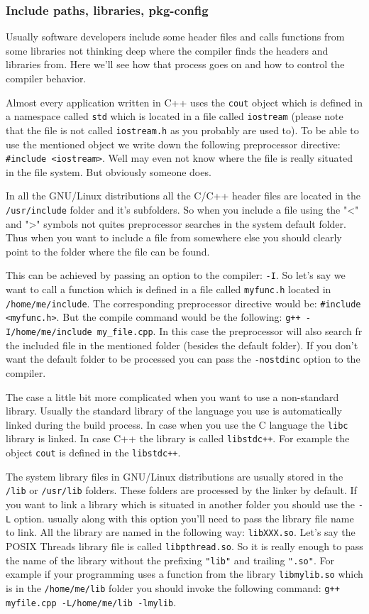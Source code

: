 \subsubsection{Include paths, libraries, pkg-config}
\label {inc_lib_pkgconfig}
Usually software developers include some header files and calls functions from some libraries not thinking deep where the compiler finds the headers and libraries from. Here we'll see how that process goes on and how to control the compiler behavior.

Almost every application written in C++ uses the {\tt cout} object which is defined in a namespace called {\tt std} which is located in a file called {\tt iostream} (please note that the file is not called {\tt iostream.h} as you probably are used to). To be able to use the mentioned object we write down the following preprocessor directive: {\tt \#include <iostream>}. Well may even not know where the file is really situated in the file system. But obviously someone does. 

In all the GNU/Linux distributions all the C/C++ header files are located in the {\tt /usr/include} folder and it's subfolders. So when you include a file using the "<" and ">" symbols not quites preprocessor searches in the system default folder. Thus when you want to include a file from somewhere else you should clearly point to the folder where the file can be found.

This can be achieved by passing an option to the compiler: {\tt -I}. So let's say we want to call a function which is defined in a file called {\tt myfunc.h} located in {\tt /home/me/include}. The corresponding preprocessor directive would be: {\tt \#include <myfunc.h>}. But the compile command would be the following: {\tt g++ -I/home/me/include my\_file.cpp}. In this case the preprocessor will also search fr the included file in the mentioned folder (besides the default folder). If you don't want the default folder to be processed you can pass the {\tt -nostdinc} option to the compiler.

The case a little bit more complicated when you want to use a non-standard library. Usually the standard library of the language you use is automatically linked during the build process. In case when you use the C language the {\tt libc} library is linked. In case C++ the library is called {\tt libstdc++}. For example the object {\tt cout} is defined in the {\tt libstdc++}.

The system library files in GNU/Linux distributions are usually stored in the {\tt /lib} or {\tt /usr/lib} folders. These folders are processed by the linker by default. If you want to link a library which is situated in another folder you should use the {\tt -L} option. usually along with this option you'll need to pass the library file name to link. All the library are named in the following way: {\tt libXXX.so}. Let's say the POSIX Threads library file is called {\tt libpthread.so}. So it is really enough to pass the name of the library without the prefixing {\tt "lib"} and trailing {\tt ".so"}. For example if your programming uses a function from the library {\tt libmylib.so} which is in the {\tt /home/me/lib} folder you should invoke the following command: {\tt g++ myfile.cpp -L/home/me/lib -lmylib}. 

